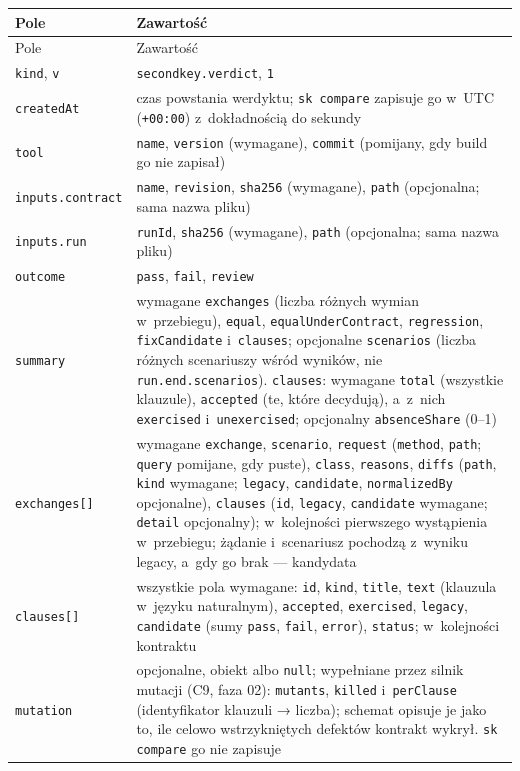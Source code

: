 {\small
\begin{xltabular}{\linewidth}{@{}>{\raggedright\arraybackslash}p{3.8cm} >{\raggedright\arraybackslash}X@{}}
\toprule
Pole & Zawartość \\
\midrule
\endfirsthead
\toprule
Pole & Zawartość \\
\midrule
\endhead
\bottomrule
\endlastfoot
\texttt{kind}, \texttt{v} & \texttt{secondkey.verdict}, \texttt{1} \\
\texttt{createdAt} & czas powstania werdyktu; \texttt{sk compare} zapisuje go w~UTC
(\texttt{+00:00}) z~dokładnością do sekundy \\
\texttt{tool} & \texttt{name}, \texttt{version} (wymagane), \texttt{commit} (pomijany, gdy build
go nie zapisał) \\
\texttt{inputs.contract} & \texttt{name}, \texttt{revision}, \texttt{sha256} (wymagane),
\texttt{path} (opcjonalna; sama nazwa pliku) \\
\texttt{inputs.run} & \texttt{runId}, \texttt{sha256} (wymagane), \texttt{path} (opcjonalna;
sama nazwa pliku) \\
\texttt{outcome} & \texttt{pass}, \texttt{fail}, \texttt{review} \\
\texttt{summary} & wymagane \texttt{exchanges} (liczba różnych wymian w~przebiegu),
\texttt{equal}, \texttt{equalUnderContract}, \texttt{regression}, \texttt{fixCandidate}
i~\texttt{clauses}; opcjonalne \texttt{scenarios} (liczba różnych scenariuszy wśród wyników, nie
\texttt{run.end.scenarios}). \texttt{clauses}: wymagane \texttt{total} (wszystkie klauzule),
\texttt{accepted} (te, które decydują), a~z~nich \texttt{exercised} i~\texttt{unexercised};
opcjonalny \texttt{absenceShare} (0--1) \\
\texttt{exchanges[]} & wymagane \texttt{exchange}, \texttt{scenario}, \texttt{request}
(\texttt{method}, \texttt{path}; \texttt{query} pomijane, gdy puste), \texttt{class},
\texttt{reasons}, \texttt{diffs} (\texttt{path}, \texttt{kind} wymagane; \texttt{legacy},
\texttt{candidate}, \texttt{normalizedBy} opcjonalne), \texttt{clauses} (\texttt{id},
\texttt{legacy}, \texttt{candidate} wymagane; \texttt{detail} opcjonalny); w~kolejności
pierwszego wystąpienia w~przebiegu; żądanie i~scenariusz pochodzą z~wyniku legacy, a~gdy go
brak --- kandydata \\
\texttt{clauses[]} & wszystkie pola wymagane: \texttt{id}, \texttt{kind}, \texttt{title},
\texttt{text} (klauzula w~języku naturalnym), \texttt{accepted}, \texttt{exercised},
\texttt{legacy}, \texttt{candidate} (sumy \texttt{pass}, \texttt{fail}, \texttt{error}),
\texttt{status}; w~kolejności kontraktu \\
\texttt{mutation} & opcjonalne, obiekt albo \texttt{null}; wypełniane przez silnik mutacji (C9,
faza 02): \texttt{mutants}, \texttt{killed} i~\texttt{perClause} (identyfikator klauzuli →
liczba); schemat opisuje je jako to, ile celowo wstrzykniętych defektów kontrakt wykrył.
\texttt{sk compare} go nie zapisuje \\
\end{xltabular}
}

